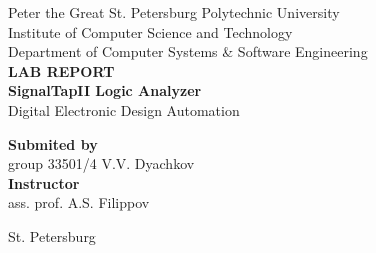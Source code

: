 \begin{titlepage}
\begin{center}
	Peter the Great St. Petersburg Polytechnic University\\[0.3cm]
	Institute of Computer Science and Technology\\[0.3cm]
	Department of Computer Systems \& Software Engineering\\[4.5cm]
	
	\textbf{LAB REPORT}\\[0.5cm]
	\textbf{SignalTapII Logic Analyzer}\\[0.1cm]
	Digital Electronic Design Automation\\[4.5cm]
\end{center}

\begin{flushright}
	\begin{minipage}{0.4\textwidth}
		\textbf{Submited by}\\[3mm]
		group 33501/4 \hspace*{3mm} V.V. Dyachkov\\[5mm]
		\textbf{Instructor}\\[5mm]
		\sign[1.8cm] \hspace*{0mm} ass. prof. A.S. Filippov\\[5mm]
	\end{minipage}
\end{flushright}

\vfill

\begin{center}
	St. Petersburg\\
	\the\year
\end{center}
\end{titlepage}

\addtocounter{page}{1}
